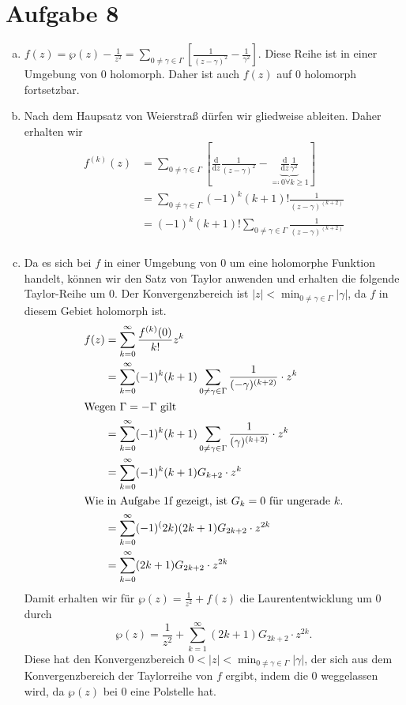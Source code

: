\documentclass{article}
\begin{document}
  \section*{Aufgabe 8}
  \begin{enumerate}[(a)]
    \item $f(z) = \wp(z) - \frac{1}{z^2} = \sum_{0 \neq \gamma \in \Gamma}\left[\frac{1}{(z- \gamma)^2} - \frac{1}{\gamma^2}\right]$. Diese Reihe ist in einer Umgebung von 0 holomorph. Daher ist auch $f(z)$ auf 0 holomorph fortsetzbar.
    \item Nach dem Haupsatz von Weierstraß dürfen wir gliedweise ableiten. Daher erhalten wir
    \begin{align*}
      f^{(k)}(z) &= \sum_{0 \neq \gamma \in \Gamma}\left[ \frac{\mathrm{d}}{\mathrm{d} z}\frac{1}{(z- \gamma)^2} - \underbrace{\frac{\mathrm{d}}{\mathrm{d} z}\frac{1}{\gamma^2}}_{\eqqcolon 0 \forall k \geq 1}\right]\\
      &= \sum_{0 \neq \gamma \in \Gamma}(-1)^k(k+1)!\frac{1}{(z- \gamma)^{(k+2)}}\\
      &= (-1)^k(k+1)! \sum_{0 \neq \gamma \in \Gamma}\frac{1}{(z- \gamma)^{(k+2)}}\\
    \end{align*}
    \item Da es sich bei $f$ in einer Umgebung von $0$ um eine holomorphe Funktion handelt, können wir den Satz von Taylor anwenden und erhalten die folgende Taylor-Reihe um 0. Der Konvergenzbereich ist $|z| < \min_{0 \neq \gamma \in \Gamma} |\gamma|$, da $f$ in diesem Gebiet holomorph ist.
    \begin{align*}
      f(z) &= \sum_{k = 0}^{\infty} \frac{f^{(k)}(0)}{k!} z^k\\
      &= \sum_{k = 0}^{\infty} (-1)^k (k+1) \sum_{0 \neq \gamma \in \Gamma}\frac{1}{(- \gamma)^{(k+2)}} \cdot z^k\\
      \intertext{Wegen $\Gamma = - \Gamma$ gilt}
      &= \sum_{k = 0}^{\infty} (-1)^k (k+1) \sum_{0 \neq \gamma \in \Gamma}\frac{1}{(\gamma)^{(k+2)}}\cdot z^k\\
      &= \sum_{k = 0}^{\infty} (-1)^k (k+1) G_{k+2} \cdot z^k\\
      \intertext{Wie in Aufgabe 1f gezeigt, ist $G_{k} = 0$ für ungerade $k$.}
      &= \sum_{k = 0}^{\infty} (-1)^(2k) (2k+1) G_{2k+2} \cdot z^{2k}\\
      &= \sum_{k = 0}^{\infty} (2k+1) G_{2k+2} \cdot z^{2k}\\
    \end{align*}
    Damit erhalten wir für $\wp(z) = \frac{1}{z^2} + f(z)$ die Laurententwicklung um 0 durch
    \[
      \wp(z) = \frac{1}{z^2} + \sum_{k = 1}^{\infty} (2k+1)G_{2k+2}\cdot z^{2k}.
    \]
    Diese hat den Konvergenzbereich $0 < |z| < \min_{0 \neq \gamma \in \Gamma} |\gamma|$, der sich aus dem Konvergenzbereich der Taylorreihe von $f$ ergibt, indem die $0$ weggelassen wird, da $\wp(z)$ bei 0 eine Polstelle hat.
  \end{enumerate}
\end{document}
